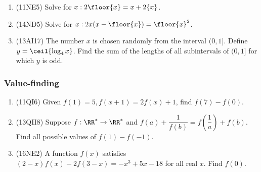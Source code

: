 \documentclass[10pt,paper=letter]{scrartcl}
\begin{document}
\begin{enumerate}

\item (11NE5) Solve for $x: 2\floor{x} = x + 2\{x\}$.

\item (14ND5) Solve for $x: 2x(x - \floor{x}) = \floor{x}^2$.

\item (13AI17) The number $x$ is chosen randomly from the interval $(0, 1]$. Define $y = \ceil{\log_4 x}$. Find the sum of the lengths of all subintervals of $(0, 1]$ for which $y$ is odd.

\end{enumerate}

\subsubsection*{Value-finding}

\begin{enumerate}

\item (11QI6) Given $f(1) = 5, f(x+1) = 2f(x) + 1$, find $f(7) - f(0)$.


\item (13QII8) Suppose $f: \RR^* \to \RR^*$ and $f(a) + \dfrac{1}{f(b)} = f\left(\dfrac{1}{a}\right) + f(b)$. Find all possible values of $f(1) - f(-1)$.

\item (16NE2) A function $f(x)$ satisfies $(2-x)f(x) - 2f(3-x) = -x^3 + 5x - 18$ for all real $x$. Find $f(0)$.



\end{enumerate}
\end{document}
